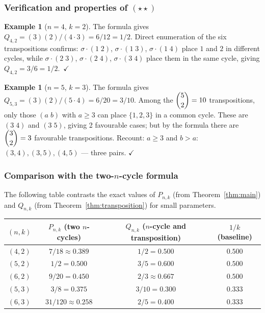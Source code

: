 \documentclass[12pt,a4paper]{article}
\theoremstyle{definition}
\newtheorem{example}[theorem]{Example}
\renewcommand{\binom}[2]{\dbinom{#1}{#2}}
\begin{document}
\subsubsection*{Verification and properties of $(\star\!\star)$}

\begin{example}[$n=4$, $k=2$]
The formula gives $Q_{4,2}=(3)(2)/(4\cdot 3)=6/12=1/2$.
Direct enumeration of the six transpositions confirms: $\sigma\cdot(1\;2)$,
$\sigma\cdot(1\;3)$, $\sigma\cdot(1\;4)$ place $1$ and $2$ in different
cycles, while $\sigma\cdot(2\;3)$, $\sigma\cdot(2\;4)$, $\sigma\cdot(3\;4)$
place them in the same cycle, giving $Q_{4,2}=3/6=1/2$.\ $\checkmark$
\end{example}

\begin{example}[$n=5$, $k=3$]
The formula gives $Q_{5,3}=(3)(2)/(5\cdot 4)=6/20=3/10$.
Among the $\binom{5}{2}=10$ transpositions, only those $(a\;b)$
with $a\ge 3$ can place $\{1,2,3\}$ in a common cycle.  These are
$(3\;4)$ and $(3\;5)$, giving 2 favourable cases; but by the formula
there are $\binom{3}{2}=3$ favourable transpositions.  Recount: $a\ge 3$
and $b>a$: $(3,4),(3,5),(4,5)$ — three pairs. $\checkmark$
\end{example}

\subsubsection*{Comparison with the two-$n$-cycle formula}

The following table contrasts the exact values of $P_{n,k}$ (from
Theorem~\ref{thm:main}) and $Q_{n,k}$ (from Theorem~\ref{thm:transposition})
for small parameters.

\begin{center}
\renewcommand{\arraystretch}{1.3}
\begin{tabular}{c|c|c|c}
$(n,k)$ & $P_{n,k}$ (two $n$-cycles) & $Q_{n,k}$ ($n$-cycle and transposition) & $1/k$ (baseline) \\\hline
$(4,2)$ & $7/18\approx 0.389$ & $1/2 = 0.500$ & $0.500$ \\
$(5,2)$ & $1/2 = 0.500$ & $3/5 = 0.600$ & $0.500$ \\
$(6,2)$ & $9/20 = 0.450$ & $2/3\approx 0.667$ & $0.500$ \\
$(5,3)$ & $3/8 = 0.375$ & $3/10 = 0.300$ & $0.333$ \\
$(6,3)$ & $31/120\approx 0.258$ & $2/5 = 0.400$ & $0.333$ \\
\end{tabular}
\end{center}
\end{document}
